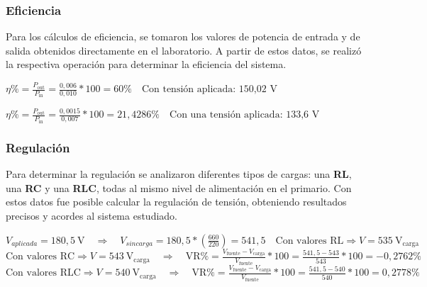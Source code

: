 \subsubsection{Eficiencia}

Para los cálculos de eficiencia, se tomaron los valores de potencia de entrada y de salida obtenidos directamente en el laboratorio. A partir de estos datos, se realizó la respectiva operación para determinar la eficiencia del sistema.

\begin{center}
    $\eta\% = \frac{P_\text{out}}{P_\text{in}} = \frac{0,006}{0,010} * 100 = 60\% \quad \text{Con tensión aplicada: 150,02 V}$ \\
    \vspace{0.5cm}

    $\eta\% = \frac{P_\text{out}}{P_\text{in}} = \frac{0,0015}{0,007} * 100 = 21,4286\% \quad \text{Con una tensión aplicada: 133,6 V}$ \\
\end{center}


\subsubsection{Regulación}

Para determinar la regulación se analizaron diferentes tipos de cargas: una \textbf{RL}, una \textbf{RC} y una \textbf{RLC}, todas al mismo nivel de alimentación en el primario. Con estos datos fue posible calcular la regulación de tensión, obteniendo resultados precisos y acordes al sistema estudiado.
\begin{center}
    $V_{aplicada} = 180,5~\mathrm{V} \quad\Rightarrow\quad V_{sin carga} = 180,5 * \left(\frac{660}{220}\right) = 541,5 \quad \text{Con valores RL} \Rightarrow V = 535~\mathrm{V_{carga}}$ \\
    \vspace{0.5cm}
    $\text{Con valores RC} \Rightarrow V = 543~\mathrm{V_{carga}} \quad\Rightarrow\quad \mathrm{VR\%} = \frac{V_\mathrm{fuente} - V_\mathrm{carga}}{V_\mathrm{fuente}} * 100 = \frac{541,5 - 543}{543} * 100 = -0,2762\%$ \\
    \vspace{0.5cm}
    $\text{Con valores RLC} \Rightarrow V = 540~\mathrm{V_{carga}} \quad\Rightarrow\quad \mathrm{VR\%} = \frac{V_\mathrm{fuente} - V_\mathrm{carga}}{V_\mathrm{fuente}} * 100 = \frac{541,5 - 540}{540} * 100 = 0,2778\%$ \\
\end{center}